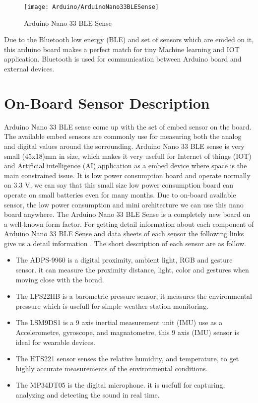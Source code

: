\begin{figure}[ht]
	\centering
	\texttt{[image: Arduino/ArduinoNano33BLESense]}
	\caption{Arduino Nano 33 BLE Sense} 
	\label{Arduino Nano}
\end{figure}

Due to the Bluetooth low energy (BLE) and set of sensors which are emded on it, this arduino board makes a perfect match for tiny Machine learning and IOT application. Bluetooth is used for communication between Arduino board and external devices. 

\section{On-Board Sensor Description}

Arduino Nano 33 BLE sense come up with the set of embed sensor on the board. The available embed sensors are commonly use for measuring both the analog and digital values around the sorrounding. Arduino Nano 33 BLE sense is very small (45x18)mm in size, which  makes it very usefull for Internet of things (IOT) and Artificial intelligence (AI) application as a embed device where space is the main constrained issue. It is low power consumption board and operate normally on 3.3 V, we can say that this small size low power consumption board can operate on small batteries even for many months. Due to on-board available sensor, the low power consumption and mini architecture we can use this nano board anywhere. The Arduino Nano 33 BLE Sense is a completely new board on a well-known form factor. For getting detail information about each component of Arduino Nano 33 BLE Sense and data sheets of each sensor the following links give us a detail information \cite{ArduinoNano33:2021}. The short description of each sensor are as follow. 

\begin{itemize}
	\item The ADPS-9960 is a digital proximity, ambient light, RGB and gesture sensor. it can measure the proximity distance, light, color and gestures when moving close with the borad.
	\item The LPS22HB is a barometric pressure sensor, it measures the environmental pressure which is usefull for simple weather station monitoring. 
	\item The LSM9DS1 is a 9 axis inertial measurement unit (IMU) use as a Accelerometre, gyroscope, and magnatometre, this 9 axis (IMU) sensor is ideal for wearable devices.
	\item The HTS221 sensor senses the relative humidity, and temperature, to get highly accurate measurements of the environmental conditions.
	\item The MP34DT05 is the digital microphone. it is usefull for capturing, analyzing and detecting the sound in real time.
\end{itemize}

